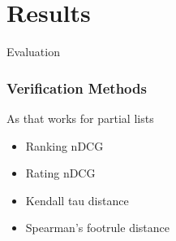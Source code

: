 \section{Results}
\begin{frame}
     \begin{center}
     	\huge Evaluation 
     \end{center}
\end{frame}

\begin{frame}
\frametitle{Verification Methods}
As that works for partial lists
\begin{itemize}
\item Ranking nDCG
\item Rating nDCG
\item Kendall tau distance 
\item Spearman's footrule distance 
\end{itemize}
\end{frame}

